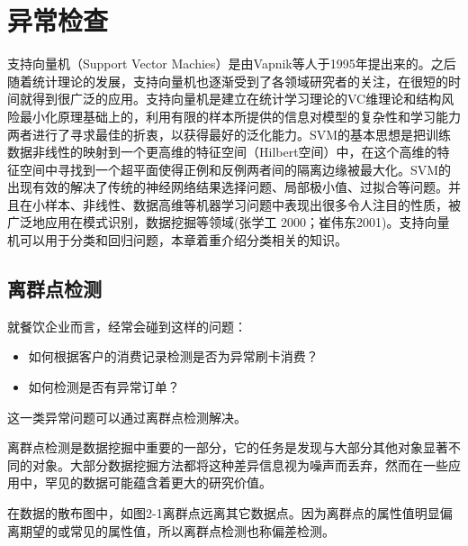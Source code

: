 \section{异常检查}
支持向量机（Support Vector Machies）是由Vapnik等人于1995年提出来的。之后随着统计理论的发展，支持向量机也逐渐受到了各领域研究者的关注，在很短的时间就得到很广泛的应用。支持向量机是建立在统计学习理论的VC维理论和结构风险最小化原理基础上的，利用有限的样本所提供的信息对模型的复杂性和学习能力两者进行了寻求最佳的折衷，以获得最好的泛化能力。SVM的基本思想是把训练数据非线性的映射到一个更高维的特征空间（Hilbert空间）中，在这个高维的特征空间中寻找到一个超平面使得正例和反例两者间的隔离边缘被最大化。SVM的出现有效的解决了传统的神经网络结果选择问题、局部极小值、过拟合等问题。并且在小样本、非线性、数据高维等机器学习问题中表现出很多令人注目的性质，被广泛地应用在模式识别，数据挖掘等领域(张学工 2000；崔伟东2001)。支持向量机可以用于分类和回归问题，本章着重介绍分类相关的知识。\\

\subsection{离群点检测}


就餐饮企业而言，经常会碰到这样的问题：

\begin{itemize}[leftmargin=1cm]

\item 如何根据客户的消费记录检测是否为异常刷卡消费？

\item 如何检测是否有异常订单？

\end{itemize}

这一类异常问题可以通过离群点检测解决。

离群点检测是数据挖掘中重要的一部分，它的任务是发现与大部分其他对象显著不同的对象。大部分数据挖掘方法都将这种差异信息视为噪声而丢弃，然而在一些应用中，罕见的数据可能蕴含着更大的研究价值。

在数据的散布图中，如图2-1离群点远离其它数据点。因为离群点的属性值明显偏离期望的或常见的属性值，所以离群点检测也称偏差检测。

